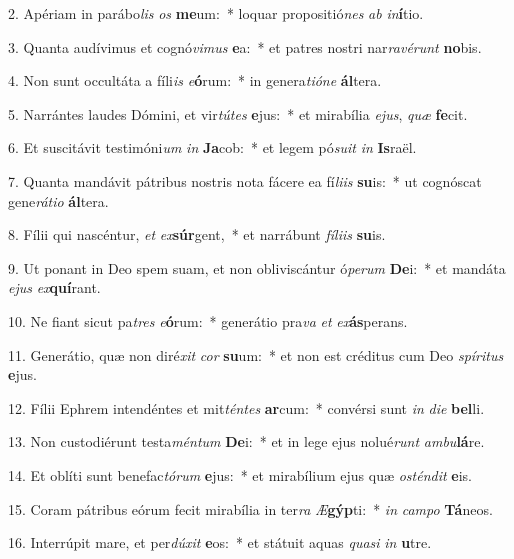 2. Apériam in parábo\textit{lis} \textit{os} \textbf{me}um:~*  loquar propositió\textit{nes} \textit{ab} \textit{in}\textbf{í}tio.\

3. Quanta audívimus et cognó\textit{vi}\textit{mus} \textbf{e}a:~*  et patres nostri nar\textit{ra}\textit{vé}\textit{runt} \textbf{no}bis.\

4. Non sunt occultáta a fíli\textit{is} \textit{e}\textbf{ó}rum:~*  in genera\textit{ti}\textit{ó}\textit{ne} \textbf{ál}tera.\

5. Narrántes laudes Dómini, et vir\textit{tú}\textit{tes} \textbf{e}jus:~*  et mirabília \textit{e}\textit{jus}, \textit{quæ} \textbf{fe}cit.\

6. Et suscitávit testimóni\textit{um} \textit{in} \textbf{Ja}cob:~*  et legem pó\textit{su}\textit{it} \textit{in} \textbf{Is}raël.\

7. Quanta mandávit pátribus nostris nota fácere ea fí\textit{li}\textit{is} \textbf{su}is:~*  ut cognóscat gene\textit{rá}\textit{ti}\textit{o} \textbf{ál}tera.\

8. Fílii qui nascéntur, \textit{et} \textit{ex}\textbf{súr}gent,~*  et narrábunt \textit{fí}\textit{li}\textit{is} \textbf{su}is.\

9. Ut ponant in Deo spem suam, et non obliviscántur ó\textit{pe}\textit{rum} \textbf{De}i:~*  et mandáta \textit{e}\textit{jus} \textit{ex}\textbf{quí}rant.\

10. Ne fiant sicut pa\textit{tres} \textit{e}\textbf{ó}rum:~*  generátio pra\textit{va} \textit{et} \textit{ex}\textbf{ás}perans.\

11. Generátio, quæ non diré\textit{xit} \textit{cor} \textbf{su}um:~*  et non est créditus cum Deo \textit{spí}\textit{ri}\textit{tus} \textbf{e}jus.\

12. Fílii Ephrem intendéntes et mit\textit{tén}\textit{tes} \textbf{ar}cum:~*  convérsi sunt \textit{in} \textit{di}\textit{e} \textbf{bel}li.\

13. Non custodiérunt testa\textit{mén}\textit{tum} \textbf{De}i:~*  et in lege ejus nolué\textit{runt} \textit{am}\textit{bu}\textbf{lá}re.\

14. Et oblíti sunt benefac\textit{tó}\textit{rum} \textbf{e}jus:~*  et mirabílium ejus quæ \textit{os}\textit{tén}\textit{dit} \textbf{e}is.\

15. Coram pátribus eórum fecit mirabília in ter\textit{ra} \textit{Æ}\textbf{gýp}ti:~*  \textit{in} \textit{cam}\textit{po} \textbf{Tá}neos.\

16. Interrúpit mare, et per\textit{dú}\textit{xit} \textbf{e}os:~*  et státuit aquas \textit{qua}\textit{si} \textit{in} \textbf{u}tre.\

